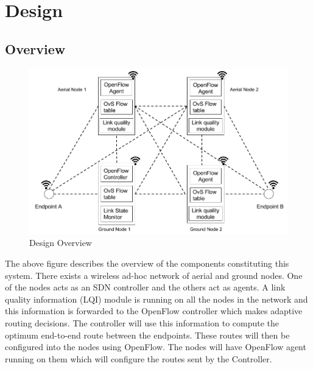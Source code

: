 \documentclass{article}
\begin{document}
\section{Design}
\subsection{Overview}
\begin{figure}[H]
\caption{Design Overview}
\centering
\includegraphics[width=\textwidth]{design}
\end{figure}
The above figure describes the overview of the components constituting this system. There exists a wireless ad-hoc
network of aerial and ground nodes. One of the nodes acts as an SDN controller and the others act as agents. A link
quality information (LQI) module is running on all the nodes in the network and this information is forwarded to the
OpenFlow controller which makes adaptive routing decisions. The controller will use this information to compute the
optimum end-to-end route between the endpoints. These routes will then be configured into the nodes using OpenFlow. The
nodes will have OpenFlow agent running on them which will configure the routes sent by the Controller. 
\end{document}
